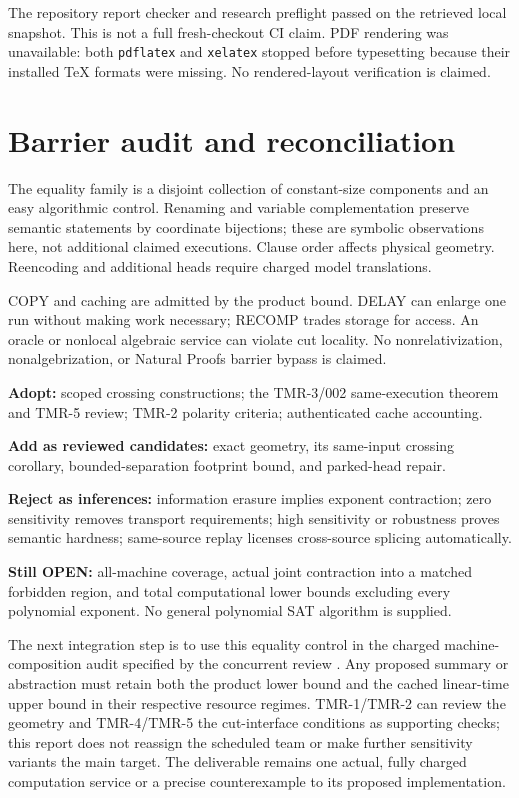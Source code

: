 \documentclass[11pt]{article}
\begin{document}
The repository report checker and research preflight passed on the retrieved local snapshot. This is not a full fresh-checkout CI claim. PDF rendering was unavailable: both \texttt{pdflatex} and \texttt{xelatex} stopped before typesetting because their installed TeX formats were missing. No rendered-layout verification is claimed.

\section{Barrier audit and reconciliation}
The equality family is a disjoint collection of constant-size components and an easy algorithmic control. Renaming and variable complementation preserve semantic statements by coordinate bijections; these are symbolic observations here, not additional claimed executions. Clause order affects physical geometry. Reencoding and additional heads require charged model translations.

COPY and caching are admitted by the product bound. DELAY can enlarge one run without making work necessary; RECOMP trades storage for access. An oracle or nonlocal algebraic service can violate cut locality. No nonrelativization, nonalgebrization, or Natural Proofs barrier bypass is claimed.

\textbf{Adopt:} scoped crossing constructions; the TMR-3/002 same-execution theorem and TMR-5 review; TMR-2 polarity criteria; authenticated cache accounting.

\textbf{Add as reviewed candidates:} exact geometry, its same-input crossing corollary, bounded-separation footprint bound, and parked-head repair.

\textbf{Reject as inferences:} information erasure implies exponent contraction; zero sensitivity removes transport requirements; high sensitivity or robustness proves semantic hardness; same-source replay licenses cross-source splicing automatically.

\textbf{Still OPEN:} all-machine coverage, actual joint contraction into a matched forbidden region, and total computational lower bounds excluding every polynomial exponent. No general polynomial SAT algorithm is supplied.

The next integration step is to use this equality control in the charged machine-composition audit specified by the concurrent review \cite{composition}. Any proposed summary or abstraction must retain both the product lower bound and the cached linear-time upper bound in their respective resource regimes. TMR-1/TMR-2 can review the geometry and TMR-4/TMR-5 the cut-interface conditions as supporting checks; this report does not reassign the scheduled team or make further sensitivity variants the main target. The deliverable remains one actual, fully charged computation service or a precise counterexample to its proposed implementation.
\end{document}
